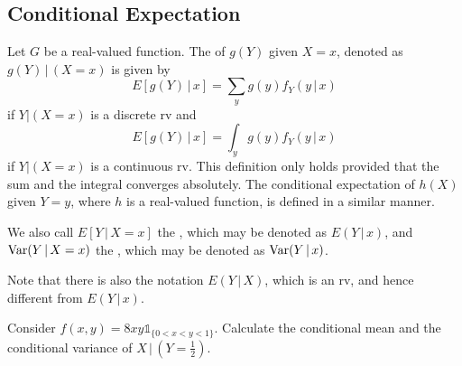 \documentclass[notoc,notitlepage]{tufte-book}
\begin{document}

\subsection{Conditional Expectation}%
\label{sub:conditional_expectation}

\begin{defn}
\label{defn:conditional_expectation}
  Let $G$ be a real-valued function. The  of $g(Y)$ given $X = x$, denoted as $g(Y) \, | \, \left( X = x \right)$ is given by
  \begin{equation*}
    E \left[ g(Y) \, | \, x \right] = \sum_{y} g(y) f_Y( y \, | \, x )
  \end{equation*}
  if $Y | (X = x)$ is a discrete rv and
  \begin{equation*}
    E \left[ g(Y) \, | \, x \right] = \int_{y} g(y) f_Y( y \, | \, x )
  \end{equation*}
  if $Y | (X = x)$ is a continuous rv. This definition only holds provided that the sum and the integral converges absolutely. The conditional expectation of $h(X)$ given $Y = y$, where $h$ is a real-valued function, is defined in a similar manner.

  We also call $E[ Y \, | \, X = x ]$ the , which may be denoted as $E( Y \, | \, x )$, and $\operatorname{Var}(Y \, | \, X = x)$ the , which may be denoted as $\operatorname{Var}(Y \, | \, x)$.
\end{defn}

\begin{note}
  Note that there is also the notation $E(Y \, | \, X)$, which is an rv, and hence different from $E(Y \, | \, x)$.
\end{note}

\begin{eg}[Example 3.21]
  Consider $f(x, y) = 8xy \mathbb{1}_{\{0 < x < y < 1\}}$. Calculate the conditional mean and the conditional variance of $X \, | \, \left( Y = \frac{1}{2} \right)$.
\end{eg}
\end{document}
